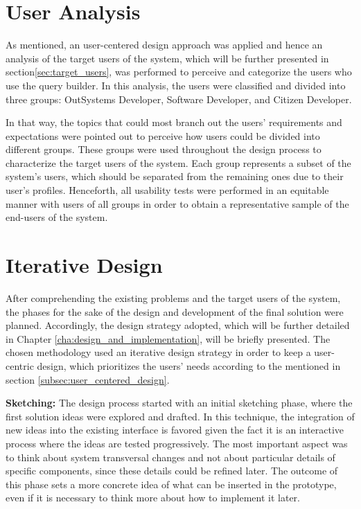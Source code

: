 \section{User Analysis}
\label{sec:user_analysis}
As mentioned, an user-centered design approach was applied and hence an analysis of the target users of the system, which will be further presented in section\ref{sec:target_users}, was performed to perceive and categorize the users who use the query builder. In this analysis, the users were classified and divided into three groups: OutSystems Developer, Software Developer, and Citizen Developer.

In that way, the topics that could most branch out the users' requirements and expectations were pointed out to perceive how users could be divided into different groups. These groups were used throughout the design process to characterize the target users of the system. Each group represents a subset of the system's users, which should be separated from the remaining ones due to their user's profiles. Henceforth, all usability tests were performed in an equitable manner with users of all groups in order to obtain a representative sample of the end-users of the system.


\section{Iterative Design}
\label{sec:iterative_design}
After comprehending the existing problems and the target users of the system, the phases for the sake of the design and development of the final solution were planned. Accordingly, the design strategy adopted, which will be further detailed in Chapter \ref{cha:design_and_implementation}, will be briefly presented. The chosen methodology used an iterative design strategy in order to keep a user-centric design, which prioritizes the users' needs according to the mentioned in section \ref{subsec:user_centered_design}.


\textbf{Sketching: }The design process started with an initial sketching phase, where the first solution ideas were explored and drafted. In this technique, the integration of new ideas into the existing interface is favored given the fact it is an interactive process where the ideas are tested progressively. The most important aspect was to think about system transversal changes and not about particular details of specific components, since these details could be refined later. The outcome of this phase sets a more concrete idea of what can be inserted in the prototype, even if it is necessary to think more about how to implement it later.

